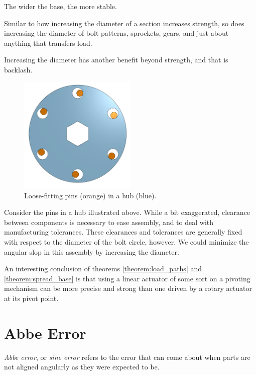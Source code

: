 \begin{theorem} \label{theorem:spread_base}
The wider the base, the more stable.
\end{theorem}

Similar to how increasing the diameter of a section increases strength, so does increasing the diameter of bolt patterns, sprockets, gears, and just about anything that transfers load.

Increasing the diameter has another benefit beyond strength, and that is backlash.


\begin{figure}
	\includegraphics[width=0.5\textwidth]{imgs/hub_tolerance.png}
	\caption{Loose-fitting pins (orange) in a hub (blue).}
\end{figure}

Consider the pins in a hub illustrated above. While a bit exaggerated, clearance between components is necessary to ease assembly, and to deal with manufacturing tolerances. These clearances and tolerances are generally fixed with respect to the diameter of the bolt circle, however. We could minimize the angular slop in this assembly by increasing the diameter.

An interesting conclusion of theorems \ref{theorem:load_paths} and \ref{theorem:spread_base} is that using a linear actuator of some sort on a pivoting mechanism can be more precise and strong than one driven by a rotary actuator at its pivot point.

\section{Abbe Error}

\textit{Abbe error}, or \textit{sine error} refers to the error that can come about when parts are not aligned angularly as they were expected to be.

